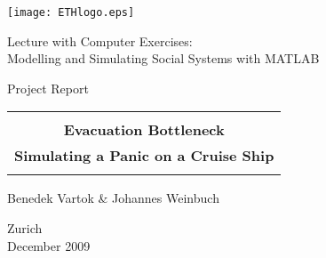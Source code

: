 
\thispagestyle{empty}

\begin{center}
\texttt{[image: ETHlogo.eps]}

\bigskip


\bigskip


\bigskip


\LARGE{ 	Lecture with Computer Exercises:\\ }
\LARGE{ Modelling and Simulating Social Systems with MATLAB\\}

\bigskip

\bigskip

\small{Project Report}\\

\bigskip

\bigskip

\bigskip

\bigskip


\begin{tabular}{|c|}
\hline
\\
\textbf{\LARGE{Evacuation Bottleneck}}\\
\textbf{\LARGE{Simulating a Panic on a Cruise Ship}}\\
\\
\hline
\end{tabular}
\bigskip

\bigskip

\bigskip

\LARGE{Benedek Vartok \& Johannes Weinbuch}



\bigskip

\bigskip

\bigskip

\bigskip

\bigskip

\bigskip

\bigskip

\bigskip

Zurich\\
December 2009\\

\end{center}


